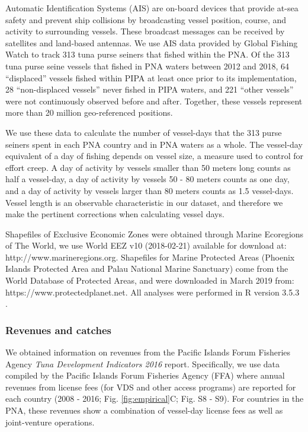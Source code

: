 \documentclass[12pt]{article}
\begin{document}
Automatic Identification Systems (AIS) are on-board devices that provide at-sea safety and prevent ship collisions by broadcasting vessel position, course, and activity to surrounding vessels. These broadcast messages can be received by satellites and land-based antennas. We use AIS data provided by Global Fishing Watch \cite{kroodsma_2018} to track 313 tuna purse seiners that fished within the PNA. Of the 313 tuna purse seine vessels that fished in PNA waters between 2012 and 2018, 64 ``displaced'' vessels fished within PIPA at least once prior to its implementation, 28 ``non-displaced vessels'' never fished in PIPA waters, and  221 ``other vessels'' were not continuously observed before and after. Together, these vessels represent more than 20 million geo-referenced positions.

We use these data to calculate the number of vessel-days that the 313 purse seiners spent in each PNA country and in PNA waters as a whole. The vessel-day equivalent of a day of fishing depends on vessel size, a measure used to control for effort creep. A day of activity by vessels smaller than 50 meters long counts as half a vessel-day, a day of activity by vessels 50 - 80 meters counts as one day, and a day of activity by vessels larger than 80 meters counts as 1.5 vessel-days. Vessel length is an observable characteristic in our dataset, and therefore we make the pertinent corrections when calculating vessel days.

Shapefiles of Exclusive Economic Zones were obtained through Marine Ecoregions of The World, we use World EEZ v10 (2018-02-21) available for download at: http://www.marineregions.org. Shapefiles for Marine Protected Areas (Phoenix Islands Protected Area and Palau National Marine Sanctuary) come from the World Database of Protected Areas, and were downloaded in March 2019 from: https://www.protectedplanet.net. All analyses were performed in R version 3.5.3 \cite{rcore_2018}.

\subsubsection{Revenues and catches}

We obtained information on revenues from the Pacific Islands Forum Fisheries Agency \emph{Tuna Development Indicators 2016} report.  Specifically, we use data compiled by the Pacific Islands Forum Fisheries Agency (FFA\cite{ffa_2017}) where annual revenues from license fees (for VDS and other access programs) are reported for each country (2008 - 2016; Fig. \ref{fig:empirical}C; Fig. S8 - S9). For countries in the PNA, these revenues show a combination of vessel-day license fees as well as joint-venture operations.
\end{document}
